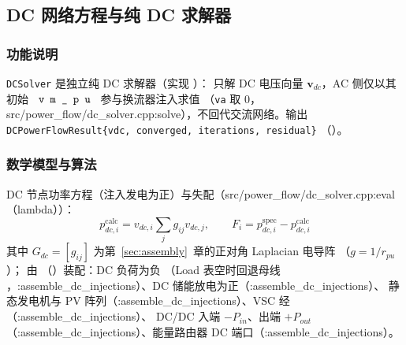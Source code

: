 \subsection{DC 网络方程与纯 DC 求解器}


\subsubsection*{功能说明}
\texttt{DCSolver} 是独立纯 DC 求解器（实现 ）：
只解 DC 电压向量 $\mathbf v_{dc}$，AC 侧仅以其初始 $\fld{vm\_pu}$ 参与换流器注入求值
（\texttt{va} 取 0，src/power\_flow/dc\_solver.cpp:solve），不回代交流网络。输出
\texttt{DCPowerFlowResult\{vdc, converged, iterations, residual\}}
（）。

\subsubsection*{数学模型与算法}
DC 节点功率方程（注入发电为正）与失配（src/power\_flow/dc\_solver.cpp:eval（lambda））：
\[
p_{dc,i}^{\mathrm{calc}}=v_{dc,i}\sum_{j}g_{ij}v_{dc,j},\qquad
F_i=p_{dc,i}^{\mathrm{spec}}-p_{dc,i}^{\mathrm{calc}}
\]
其中 $G_{dc}=[g_{ij}]$ 为第~\ref{sec:assembly}~章的正对角 Laplacian 电导阵
（$g=1/r_{pu}$）； 由 
（）装配：DC 负荷为负
（Load 表空时回退母线 ，:assemble\_dc\_injections）、DC 储能放电为正（:assemble\_dc\_injections）、
静态发电机与 PV 阵列（:assemble\_dc\_injections）、VSC 经 （:assemble\_dc\_injections）、
DC/DC 入端 $-P_{in}$、出端 $+P_{out}$（:assemble\_dc\_injections）、能量路由器 DC 端口（:assemble\_dc\_injections）。

